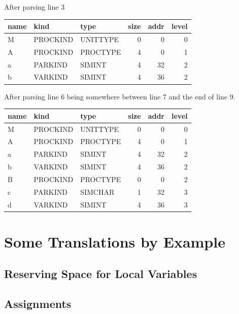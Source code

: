 \documentclass[11pt]{report}
\begin{document}
After parsing line 3

\begin{tabular}{lllrrr}
name & kind & type & size & addr & level \\
\hline
M & PROCKIND & UNITTYPE & 0 & 0 & 0 \\
A & PROCKIND & PROCTYPE & 4 & 0 & 1 \\
a & PARKIND & SIMINT & 4 & 32 & 2 \\
b & VARKIND & SIMINT & 4 & 36 & 2
\end{tabular}

After parsing line 6 being somewhere between line 7 and the end of line 9.

\begin{tabular}{lllrrr}
name & kind & type & size & addr & level \\
\hline
M & PROCKIND & UNITTYPE & 0 & 0 & 0 \\
A & PROCKIND & PROCTYPE & 4 & 0 & 1 \\
a & PARKIND & SIMINT & 4 & 32 & 2 \\
b & VARKIND & SIMINT & 4 & 36 & 2 \\
B & PROCKIND & PROCTYPE & 0 & 0 & 2 \\
c & PARKIND & SIMCHAR & 1 & 32 & 3 \\
d & VARKIND & SIMINT & 4 & 36 & 3
\end{tabular}



\chapter{Some Translations by Example}
\section{Reserving Space for Local Variables}

\section{Assignments}
\end{document}
